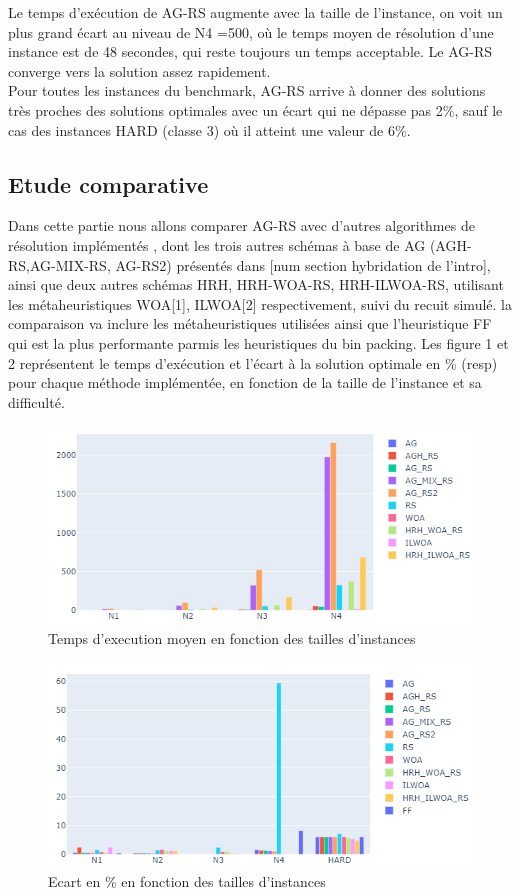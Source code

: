 \documentclass[preprint]{elsarticle}
\begin{document}
Le temps d'exécution de AG-RS augmente avec la taille de l’instance,  on  voit un plus grand écart au niveau de N4 =500, où le temps moyen de résolution d’une instance est de 48 secondes, qui reste toujours un temps acceptable. Le AG-RS converge vers la solution assez rapidement. \\
Pour toutes les instances du benchmark, AG-RS arrive à donner des solutions très proches des solutions optimales avec un écart qui ne dépasse pas 2\%, sauf le cas des instances  HARD (classe 3) où il atteint une valeur de 6\%.
\subsection{Etude comparative}
Dans cette partie nous allons comparer AG-RS avec d’autres algorithmes de résolution  implémentés , dont les trois autres schémas à base de AG (AGH-RS,AG-MIX-RS, AG-RS2) présentés dans [num section hybridation de l’intro], ainsi que deux autres schémas HRH, HRH-WOA-RS, HRH-ILWOA-RS, utilisant les métaheuristiques WOA[1], ILWOA[2] respectivement, suivi du recuit simulé. la comparaison va inclure les métaheuristiques utilisées ainsi que l’heuristique FF qui est la plus performante parmis les heuristiques du bin packing. 
\newline Les figure 1 et 2 représentent le temps d'exécution et l’écart à la solution optimale en \% (resp) pour chaque méthode implémentée,  en fonction de la taille de l’instance et sa difficulté. 

\begin{figure}[H]
    \centering
    \includegraphics[scale=0.6]{./figures/texec (2).png}
    \caption{Temps d'execution moyen en fonction des tailles d'instances}
\end{figure}

\begin{figure}[H]
    \centering
    \includegraphics[scale=0.6]{./figures/ecart (2).png}
    \caption{Ecart en \% en fonction des tailles d'instances}
\end{figure}
\end{document}
